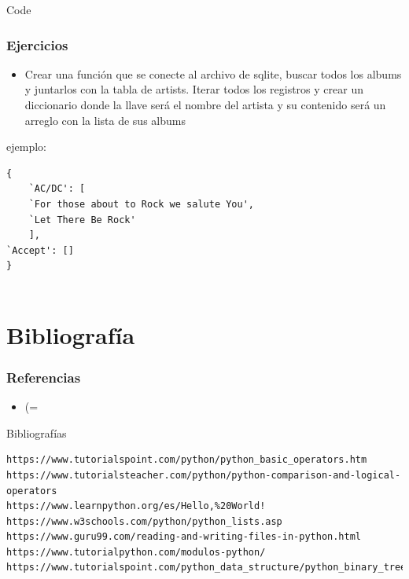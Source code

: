 \documentclass[hyperref={pdfpagelabels=false},xcolor=pst,pdf,fragile]{beamer}
\begin{document}
\begin{frame}[fragile]{Code}
    \frametitle{Ejercicios}
    \pause
    \begin{itemize}
    \item Crear una función que se conecte al archivo de sqlite, buscar todos los albums y juntarlos con la tabla de artists. Iterar todos los registros y crear un diccionario donde la llave será el nombre del artista y su contenido será un arreglo con la lista de sus albums
    \end{itemize}
    
  \begin{block}{ejemplo:} %
	  \begin{lstlisting}
{
    `AC/DC': [
    `For those about to Rock we salute You',
    `Let There Be Rock'
    ],
`Accept': []
}


	  \end{lstlisting}
  \end{block}
    
\end{frame}


\section{Bibliografía}
\begin{frame}[fragile]
  \frametitle{Referencias}
  \begin{itemize}
	\item (=
	\pause
  \end{itemize}

    \begin{block}{Bibliografías} %
	  \begin{lstlisting}
https://www.tutorialspoint.com/python/python_basic_operators.htm
https://www.tutorialsteacher.com/python/python-comparison-and-logical-operators
https://www.learnpython.org/es/Hello,%20World!
https://www.w3schools.com/python/python_lists.asp
https://www.guru99.com/reading-and-writing-files-in-python.html
https://www.tutorialpython.com/modulos-python/
https://www.tutorialspoint.com/python_data_structure/python_binary_tree.htm
	  \end{lstlisting}
  \end{block}
  
\end{frame}
\end{document}
